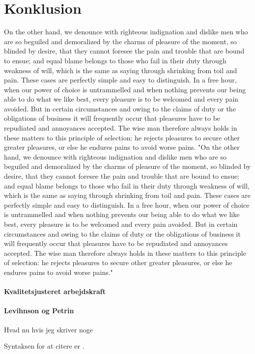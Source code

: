 \documentclass[a4paper, 12pt, titlepage]{article}
\begin{document}
\section{Konklusion}
On the other hand, we denounce with righteous indignation and dislike men who are so beguiled and demoralized by the charms of pleasure of the moment, so blinded by desire, that they cannot foresee the pain and trouble that are bound to ensue; and equal blame belongs to those who fail in their duty through weakness of will, which is the same as saying through shrinking from toil and pain. These cases are perfectly simple and easy to distinguish. In a free hour, when our power of choice is untrammelled and when nothing prevents our being able to do what we like best, every pleasure is to be welcomed and every pain avoided. But in certain circumstances and owing to the claims of duty or the obligations of business it will frequently occur that pleasures have to be repudiated and annoyances accepted. The wise man therefore always holds in these matters to this principle of selection: he rejects pleasures to secure other greater pleasures, or else he endures pains to avoid worse pains. "On the other hand, we denounce with righteous indignation and dislike men who are so beguiled and demoralized by the charms of pleasure of the moment, so blinded by desire, that they cannot foresee the pain and trouble that are bound to ensue; and equal blame belongs to those who fail in their duty through weakness of will, which is the same as saying through shrinking from toil and pain. These cases are perfectly simple and easy to distinguish. In a free hour, when our power of choice is untrammelled and when nothing prevents our being able to do what we like best, every pleasure is to be welcomed and every pain avoided. But in certain circumstances and owing to the claims of duty or the obligations of business it will frequently occur that pleasures have to be repudiated and annoyances accepted. The wise man therefore always holds in these matters to this principle of selection: he rejects pleasures to secure other greater pleasures, or else he endures pains to avoid worse pains."



\paragraph{Kvalitetsjusteret arbejdskraft}



\paragraph{Levihnson og Petrin}
Hvad nu hvis jeg skriver noge

Syntaksen for at citere er \cite[pp. 211ff.]{melo2009meta}. 






\end{document}
